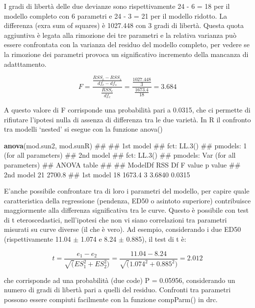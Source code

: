 \documentclass[a4paper,12pt,oneside]{book}
\newenvironment{Shaded}{\begin{snugshade}}{\end{snugshade}}
\newcommand{\KeywordTok}[1]{\textcolor[rgb]{0.13,0.29,0.53}{\textbf{#1}}}
\newcommand{\NormalTok}[1]{#1}
\theoremstyle{definition}
\theoremstyle{definition}
\theoremstyle{definition}
\theoremstyle{remark}
\begin{document}
I gradi di libertà delle due devianze sono rispettivamente 24 - 6 = 18
per il modello completo con 6 parametri e 24 - 3 = 21 per il modello
ridotto. La differenza (exra sum of squares) è 1027.448 con 3 gradi di
libertà. Questa quota aggiuntiva è legata alla rimozione dei tre
parametri e la relativa varianza può essere confrontata con la varianza
del residuo del modello completo, per vedere se la rimozione dei
parametri provoca un significativo incremento della mancanza di
adatttamento.

\[ F = \frac{\frac{RSS_c - RSS_s}{df_c - df_s}}{\frac{RSS_c}{df_c}} = \frac{\frac{1027.448}{3}}{\frac{1673.4}{18}}= 3.684\]

A questo valore di F corrisponde una probabilità pari a 0.0315, che ci
permette di rifiutare l'ipotesi nulla di assenza di differenza tra le
due varietà. In R il confronto tra modelli `nested' si esegue con la
funzione anova()

\begin{Shaded}
\begin{Highlighting}[]
\KeywordTok{anova}\NormalTok{(mod.sun2, mod.sunR)}
\NormalTok{## }
\NormalTok{## 1st model}
\NormalTok{##  fct:      LL.3()}
\NormalTok{##  pmodels: 1 (for all parameters)}
\NormalTok{## 2nd model}
\NormalTok{##  fct:      LL.3()}
\NormalTok{##  pmodels: Var (for all parameters)}
\NormalTok{## ANOVA table}
\NormalTok{## }
\NormalTok{##           ModelDf    RSS Df F value p value}
\NormalTok{## 2nd model      21 2700.8                   }
\NormalTok{## 1st model      18 1673.4  3  3.6840  0.0315}
\end{Highlighting}
\end{Shaded}

E'anche possibile confrontare tra di loro i parametri del modello, per
capire quale caratteristica della regressione (pendenza, ED50 o asintoto
superiore) contribuisce maggiormente alla differenza significativa tra
le curve. Questo è possibile con test di t eteroscedastici, nell'ipotesi
che non vi siano correlazioni tra parametri misurati su curve diverse
(il che è vero). Ad esempio, considerando i due ED50 (rispettivamente
11.04 \(\pm\) 1.074 e 8.24 \(\pm\) 0.885), il test di t è:

\[ t = \frac{e_1 - e_2}{\sqrt(ES_1^2 + ES_2^2)} = \frac{11.04 - 8.24}{\sqrt(1.074^2 + 0.885^2)} = 2.012\]

che corrisponde ad una probabilità (due code) P = 0.05956, considerando
un numero di gradi di libertà pari a quelli del residuo. Confronti tra
parametri possono essere compiuti facilmente con la funzione compParm()
in drc.
\end{document}
